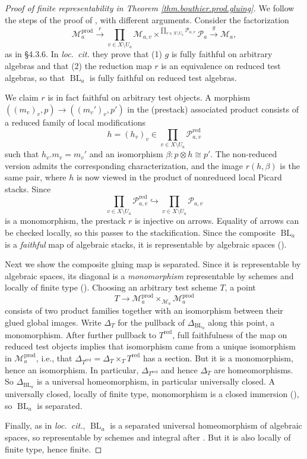 \documentclass[openany]{amsbook}
\theoremstyle{definition}
\theoremstyle{remark}
\numberwithin{equation}{section}
\newcommand{\cM}{\mathcal{M}}
\newcommand{\cP}{\mathcal{P}}
\newcommand{\red}{\mathrm{red}}
\renewcommand{\-}{\operatorname{-}}
\newcommand{\on}[1]{\operatorname{#1}}
\begin{document}
\begin{proof}[Proof of finite representability in Theorem \ref{thm.bouthier.prod.gluing}]
    We follow the steps of the proof of \cite[Theorem 4.3.8(b)]{bouthierprodform}, with different arguments. Consider the factorization
    $$
        \cM_a^{\on{prod}} \xrightarrow{\;r\;} \prod_{v \in X \setminus U_a} \cM_{a,v} \times^{\prod_{v \in X\setminus U_a} \cP_{a,v}} \cP_a \xrightarrow{\;g\;} \cM_a,
    $$
    as in \S 4.3.6. In \textit{loc.\ cit.} they prove that (1) $g$ is fully faithful on arbitrary algebras and that (2) the reduction map $r$ is an equivalence on reduced test algebras, so that $\on{BL}_a$ is fully faithful on reduced test algebras. 
    
    We claim $r$ is in fact faithful on arbitrary test objects. A morphism $((m_v)_v, p) \to ((m_v')_v, p')$ in the (prestack) associated product consists of a reduced family of local modifications 
    $$
        h = (h_v)_v \in \prod_{v \in X\setminus U_a} \cP_{a,v}^{\red}
    $$
    such that $h_v. m_v = m_v'$ and an isomorphism $\beta : p \otimes h \cong p'$. The non-reduced version admits the corresponding characterization, and the image $r(h, \beta)$ is the same pair, where $h$ is now viewed in the product of nonreduced local Picard stacks. Since
    $$
        \prod_{v \in X\setminus U_a} \cP_{a,v}^{\red} \hookrightarrow \prod_{v \in X\setminus U_a} \cP_{a,v}
    $$
    is a monomorphism, the prestack $r$ is injective on arrows. Equality of arrows can be checked locally, so this passes to the stackification. Since the composite $\on{BL}_a$ is a \emph{faithful} map of algebraic stacks, it is representable by algebraic spaces (\cite[Tag. 04Y5]{stacks-project}). 

    Next we show the composite gluing map is separated. Since it is representable by algebraic spaces, its diagonal is a \emph{monomorphism} representable by schemes and locally of finite type (\cite[Tag. 04YQ]{stacks-project}). Choosing an arbitrary test scheme $T$, a point
    $$
        T \to \cM^{\on{prod}}_a \times_{\cM_a} \cM^{\on{prod}}_a
    $$
    consists of two product families together with an isomorphism between their glued global images. Write $\Delta_T$ for the pullback of $\Delta_{\on{BL}_a}$ along this point, a monomorphism. After further pullback to $T^{\red}$, full faithfulness of the map on reduced test objects implies that isomorphism came from a unique isomorphism in $\cM^{\on{prod}}_a$, i.e., that $\Delta_{T^{\red}} = \Delta_{T} \times_T T^{\red}$ has a section. But it is a monomorphism, hence an isomorphism. In particular, $\Delta_{T^{\red}}$ and hence $\Delta_T$ are homeomorphisms. So $\Delta_{\on{BL}_a}$ is a universal homeomorphism, in particular universally closed. A universally closed, locally of finite type, monomorphism is a closed immersion (\cite[Tag. 05W8]{stacks-project}), so $\on{BL}_a$ is separated.

    Finally, as in \textit{loc.\ cit.}, $\on{BL}_a$ is a separated universal homeomorphism of algebraic spaces, so representable by schemes and integral after \cite[Corollary 5.22]{rydhdesc}. But it is also locally of finite type, hence finite.
\end{proof}
\end{document}
